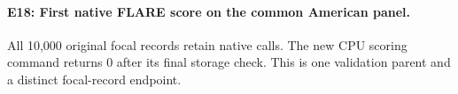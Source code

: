\documentclass[letterpaper]{article}
\begin{document}
\paragraph{E18: First native FLARE score on the common American panel.}
\noindent{}\par
\noindent{}\par
All 10,000 original focal records retain native calls. The new CPU scoring command returns 0 after its final storage check. This is one validation parent and a distinct focal-record endpoint.
\end{document}
